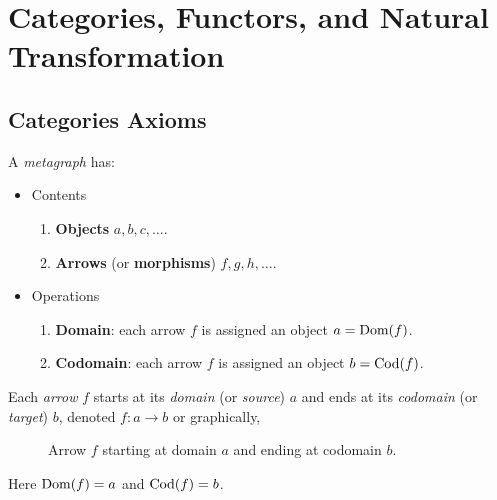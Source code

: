 \section{Categories, Functors, and Natural Transformation}

\subsection{Categories Axioms}

\begin{definition}[Metagraph]
    A \textit{metagraph} has:
    \begin{itemize}
        \item Contents
        \begin{enumerate}
            \item \textbf{Objects} $a, b, c, \dots$.
            \item \textbf{Arrows} (or \textbf{morphisms}) $f, g, h, \dots$.
        \end{enumerate}
        \item Operations
        \begin{enumerate}
            \item \textbf{Domain}: each arrow $f$ is assigned an object $a = \mathrm{Dom}(f)$.
            \item \textbf{Codomain}: each arrow $f$ is assigned an object $b = \mathrm{Cod}(f)$.
        \end{enumerate}
    \end{itemize}
    
    Each \textit{arrow} $f$ starts at its \textit{domain} (or \textit{source}) $a$ and ends at its \textit{codomain} (or \textit{target}) $b$, denoted $f \colon a \to b$ or graphically,
    \begin{figure}[H]
        \centering
        \caption{Arrow $f$ starting at domain $a$ and ending at codomain $b$.}
        \label{fig:arrow}
    \end{figure}
    
    Here $\mathrm{Dom}(f) = a$ and $\mathrm{Cod}(f) = b$.
\end{definition}

